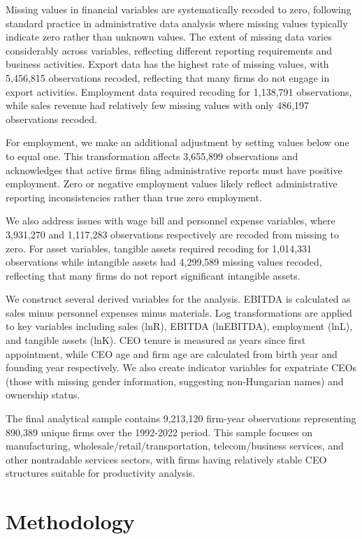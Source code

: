 \documentclass[11pt,a4paper]{article}
\begin{document}
Missing values in financial variables are systematically recoded to zero, following standard practice in administrative data analysis where missing values typically indicate zero rather than unknown values. The extent of missing data varies considerably across variables, reflecting different reporting requirements and business activities. Export data has the highest rate of missing values, with 5,456,815 observations recoded, reflecting that many firms do not engage in export activities. Employment data required recoding for 1,138,791 observations, while sales revenue had relatively few missing values with only 486,197 observations recoded.

For employment, we make an additional adjustment by setting values below one to equal one. This transformation affects 3,655,899 observations and acknowledges that active firms filing administrative reports must have positive employment. Zero or negative employment values likely reflect administrative reporting inconsistencies rather than true zero employment.

We also address issues with wage bill and personnel expense variables, where 3,931,270 and 1,117,283 observations respectively are recoded from missing to zero. For asset variables, tangible assets required recoding for 1,014,331 observations while intangible assets had 4,299,589 missing values recoded, reflecting that many firms do not report significant intangible assets.

We construct several derived variables for the analysis. EBITDA is calculated as sales minus personnel expenses minus materials. Log transformations are applied to key variables including sales (lnR), EBITDA (lnEBITDA), employment (lnL), and tangible assets (lnK). CEO tenure is measured as years since first appointment, while CEO age and firm age are calculated from birth year and founding year respectively. We also create indicator variables for expatriate CEOs (those with missing gender information, suggesting non-Hungarian names) and ownership status.

The final analytical sample contains 9,213,120 firm-year observations representing 890,389 unique firms over the 1992-2022 period. This sample focuses on manufacturing, wholesale/retail/transportation, telecom/business services, and other nontradable services sectors, with firms having relatively stable CEO structures suitable for productivity analysis.



\section{Methodology}
\end{document}
